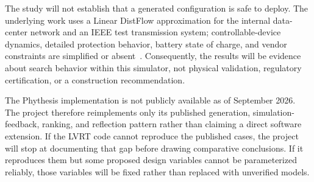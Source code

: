 \documentclass[11pt,a4paper]{article}
\begin{document}
The study will not establish that a generated configuration is safe to deploy. The underlying work uses a Linear DistFlow approximation for the internal data-center network and an IEEE test transmission system; controllable-device dynamics, detailed protection behavior, battery state of charge, and vendor constraints are simplified or absent~\cite{xie2026lvrt}. Consequently, the results will be evidence about search behavior within this simulator, not physical validation, regulatory certification, or a construction recommendation.

The Phythesis implementation is not publicly available as of September 2026. The project therefore reimplements only its published generation, simulation-feedback, ranking, and reflection pattern rather than claiming a direct software extension. If the LVRT code cannot reproduce the published cases, the project will stop at documenting that gap before drawing comparative conclusions. If it reproduces them but some proposed design variables cannot be parameterized reliably, those variables will be fixed rather than replaced with unverified models.
\end{document}

